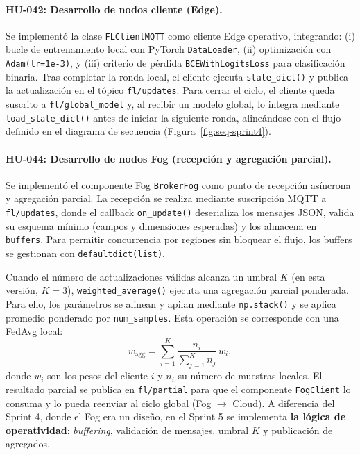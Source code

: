 \documentclass{report}
\begin{document}
\vspace{0.15em}
\paragraph{HU-042: Desarrollo de nodos cliente (Edge).}
Se implementó la clase \texttt{FLClientMQTT} como cliente Edge operativo, integrando: (i) bucle de entrenamiento local con PyTorch \texttt{DataLoader}, (ii) optimización con \texttt{Adam(lr=1e-3)}, y (iii) criterio de pérdida \texttt{BCEWithLogitsLoss} para clasificación binaria. Tras completar la ronda local, el cliente ejecuta \texttt{state\_dict()} y publica la actualización en el tópico \texttt{fl/updates}. Para cerrar el ciclo, el cliente queda suscrito a \texttt{fl/global\_model} y, al recibir un modelo global, lo integra mediante \texttt{load\_state\_dict()} antes de iniciar la siguiente ronda, alineándose con el flujo definido en el diagrama de secuencia (Figura~\ref{fig:seq-sprint4}).

\vspace{0.15em}
\paragraph{HU-044: Desarrollo de nodos Fog (recepción y agregación parcial).}
Se implementó el componente Fog \texttt{BrokerFog} como punto de recepción asíncrona y agregación parcial. La recepción se realiza mediante suscripción MQTT a \texttt{fl/updates}, donde el callback \texttt{on\_update()} deserializa los mensajes JSON, valida su esquema mínimo (campos y dimensiones esperadas) y los almacena en \texttt{buffers}. Para permitir concurrencia por regiones sin bloquear el flujo, los buffers se gestionan con \texttt{defaultdict(list)}.

Cuando el número de actualizaciones válidas alcanza un umbral $K$ (en esta versión, $K=3$), \texttt{weighted\_average()} ejecuta una agregación parcial ponderada. Para ello, los parámetros se alinean y apilan mediante \texttt{np.stack()} y se aplica promedio ponderado por \texttt{num\_samples}. Esta operación se corresponde con una FedAvg local:
\begin{equation}
\label{eq:fed-avg}
w_{\text{agg}} = \sum_{i=1}^{K} \frac{n_i}{\sum_{j=1}^{K} n_j}\, w_i,
\end{equation}
donde $w_i$ son los pesos del cliente $i$ y $n_i$ su número de muestras locales. El resultado parcial se publica en \texttt{fl/partial} para que el componente \texttt{FogClient} lo consuma y lo pueda reenviar al ciclo global (Fog $\rightarrow$ Cloud). A diferencia del Sprint 4, donde el Fog era un diseño, en el Sprint 5 se implementa \textbf{la lógica de operatividad}: \emph{buffering}, validación de mensajes, umbral $K$ y publicación de agregados.
\end{document}
